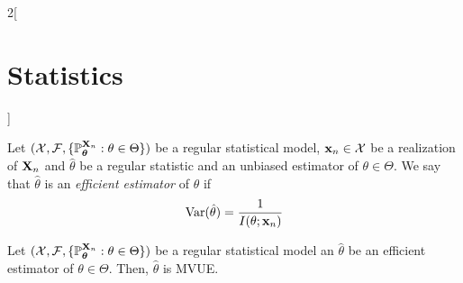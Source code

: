 \documentclass[../../../main.tex]{subfiles}
\begin{document}
\begin{multicols}{2}[\section{Statistics}]
\begin{theorem}
  \end{theorem}
  \begin{definition}
    Let $(\mathcal{X},\mathcal{F},\{\mathbb{P}_{\boldsymbol{\mathrm{\theta}}}^{\boldsymbol{\mathrm{X}}_n}:\theta\in\Theta\})$ be a regular statistical model, $\boldsymbol{\mathrm{x}}_n\in\mathcal{X}$ be a realization of $\boldsymbol{\mathrm{X}}_n$ and $\hat\theta$ be a regular statistic and an unbiased estimator of $\theta\in \Theta$. We say that $\hat\theta$ is an \emph{efficient estimator} of $\theta$ if $$\operatorname{Var}(\hat\theta)=\frac{1}{I(\theta;\boldsymbol{\mathrm{x}}_n)}$$
  \end{definition}
  \begin{proposition}
    Let $(\mathcal{X},\mathcal{F},\{\mathbb{P}_{\boldsymbol{\mathrm{\theta}}}^{\boldsymbol{\mathrm{X}}_n}:\theta\in\Theta\})$ be a regular statistical model an $\hat\theta$ be an efficient estimator of $\theta\in\Theta$. Then, $\hat\theta$ is MVUE.
  \end{proposition}

\end{multicols}
\end{document}
